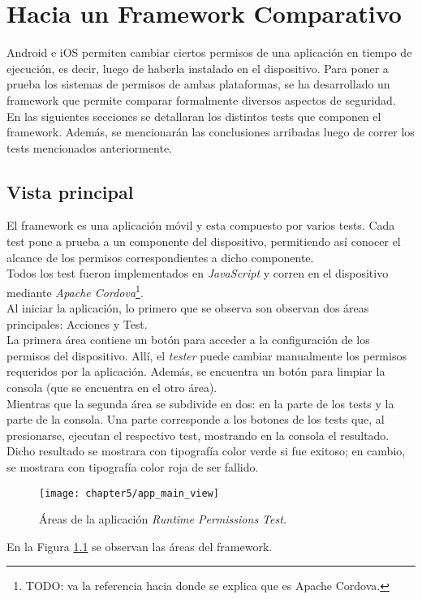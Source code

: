 \chapter{Hacia un Framework Comparativo}
Android e iOS permiten cambiar ciertos permisos de una aplicación en tiempo de ejecución, es decir, luego de haberla instalado en el dispositivo. Para poner a prueba los sistemas de permisos de ambas plataformas, se ha desarrollado un framework que permite comparar formalmente diversos aspectos de seguridad.\\
En las siguientes secciones se detallaran los distintos tests que componen el framework. Además, se mencionarán las conclusiones arribadas luego de correr los tests mencionados anteriormente.
\section{Vista principal}
El framework es una aplicación móvil y esta compuesto por varios tests. Cada test pone a prueba a un componente del dispositivo, permitiendo así conocer el alcance de los permisos correspondientes a dicho componente.\\
Todos los test fueron implementados en \emph{JavaScript} y corren en el dispositivo mediante \emph{Apache Cordova}\footnote{TODO: va la referencia hacia donde se explica que es Apache Cordova.}.\\
Al iniciar la aplicación, lo primero que se observa son observan dos áreas principales: Acciones y Test.\\
La primera área contiene un botón para acceder a la configuración de los permisos del dispositivo. Allí, el \textit{tester} puede cambiar manualmente los permisos requeridos por la aplicación. Además, se encuentra un botón para limpiar la consola (que se encuentra en el otro área).\\
Mientras que la segunda área se subdivide en dos: en la parte de los tests y la parte de la consola. Una parte corresponde a los botones de los tests que, al presionarse, ejecutan el respectivo test, mostrando en la consola el resultado. Dicho resultado se mostrara con tipografía color verde si fue exitoso; en cambio, se mostrara con tipografía color roja de ser fallido.\\
\begin{figure}[hbtp]
    \centering
	\texttt{[image: chapter5/app\_main\_view]}
	\caption{Áreas de la aplicación \textit{Runtime Permissions Test}.}
	\label{fig:chapter05:main_view}
\end{figure}
En la Figura \ref{fig:chapter05:main_view} se observan las áreas del framework.\\

